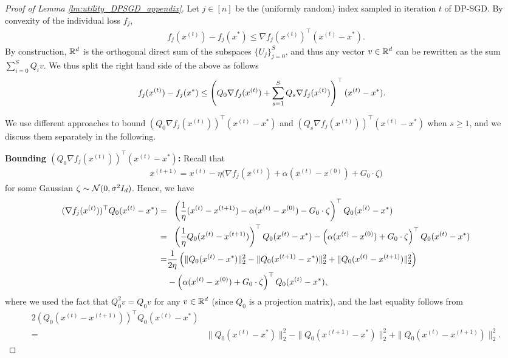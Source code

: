 \begin{proof}[Proof of Lemma \ref{lm:utility_DPSGD_appendix}]
Let $j \in [n]$ be the (uniformly random) index sampled in iteration $t$ of DP-SGD.
By convexity of the individual loss $f_j$,
\begin{align*}
    f_{j}(x^{(t)})-f_{j}(x^{*})\leq\nabla f_{j}(x^{(t)})^{\top}(x^{(t)}-x^{*}).
\end{align*}
By construction, $\mathbb{R}^d$ is the orthogonal direct sum of the subspaces $\{U_j\}_{j=0}^S$, and thus any vector $v\in \mathbb{R}^d$ can be rewritten as the sum $\sum_{i=0}^S Q_i v $.
We thus split the right hand side of the above as follows
\begin{align}
f_{j}(x^{(t)})-f_{j}(x^{*}) & \leq \left( Q_{0}\nabla f_{j}(x^{(t)})+\sum_{s=1}^{S}Q_{s}\nabla f_{j}(x^{(t)})\right)^{\top}(x^{(t)}-x^{*}).\label{eq:mirror_two_term}
\end{align}

We use different approaches to bound $(Q_0\nabla f_j(x^{(t)}))^\top (x^{(t)}-x^*)$ and $(Q_s\nabla f_j(x^{(t)}))^\top (x^{(t)}-x^*)$ when $s\geq 1$, and we discuss them separately in the following.

\medskip
{\bf  Bounding  $(Q_0\nabla f_j(x^{(t)}))^\top (x^{(t)}-x^*)$:} Recall that
\begin{align*}
    x^{(t+1)}=x^{(t)}-\eta\Big(\nabla f_j(x^{(t)})+\alpha(x^{(t)}-x^{(0)})+G_{0}\cdot \zeta\Big)
\end{align*}
for some Gaussian $\zeta\sim \mathcal N(0,\sigma^{2}I_d)$. 
Hence, we have
\begin{align}
\label{eq:duality_Q_0}
    (\nabla f_{j}(x^{(t)}))^{\top}Q_{0}(x^{(t)}-x^{*}) = &~~ \left(\frac{1}{\eta}(x^{(t)}-x^{(t+1)})-\alpha(x^{(t)}-x^{(0)})-G_{0}\cdot\zeta\right)^{\top}Q_{0}(x^{(t)}-x^{*})\nonumber \\
= & ~~ \left(\frac{1}{\eta}Q_0(x^{(t)}-x^{(t+1)})\right)^{\top}Q_{0}(x^{(t)}-x^{*})-\left(
\alpha(x^{(t)}-x^{(0)})+G_{0}\cdot\zeta
\right)^\top Q_0(x^{(t)}-x^*)\nonumber \\
=& \frac{1}{2\eta}
    \left(
        \|Q_{0}(x^{(t)}-x^{*})\|_2^{2} - 
        \|Q_{0}(x^{(t+1)}-x^{*})\|_2^{2} + 
        \|Q_{0}(x^{(t)}-x^{(t+1)})\|_2^{2}
    \right)
\nonumber \\
 ~& -\left(\alpha(x^{(t)}-x^{(0)})+G_{0}\cdot\zeta\right)^{\top}Q_{0}(x^{(t)}-x^{*}),
\end{align}
where we used the fact that $Q_0^2 v = Q_0 v$ for any $v \in \mathbb{R}^d$ (since $Q_0$ is a projection matrix), and the last equality follows from 
\begin{align*}
   2(Q_0(x^{(t)}-x^{(t+1)}))^\top Q_0(x^{(t)}-x^*) \\
 = & \|Q_{0}(x^{(t)}-x^{*})\|_2^{2} - 
    \|Q_{0}(x^{(t+1)}-x^{*})\|_2^{2} + 
    \|Q_{0}(x^{(t)}-x^{(t+1)})\|_2^{2}.
\end{align*}


\end{proof}

